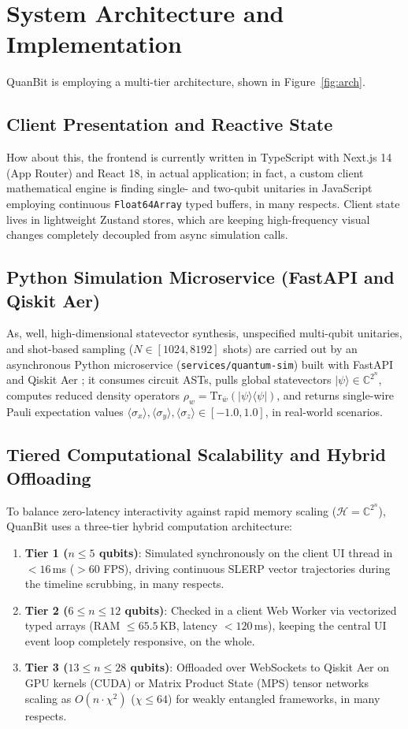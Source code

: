 \documentclass[conference]{IEEEtran}
\begin{document}
\section{System Architecture and Implementation}
\label{sec:arch_impl}

QuanBit is employing a multi-tier architecture, shown in Figure~\ref{fig:arch}.

\subsection{Client Presentation and Reactive State}
How about this, the frontend is currently written in TypeScript with Next.js 14 (App Router) and React 18, in actual application; in fact, a custom client mathematical engine is finding single- and two-qubit unitaries in JavaScript employing continuous \texttt{Float64Array} typed buffers, in many respects. Client state lives in lightweight Zustand stores, which are keeping high-frequency visual changes completely decoupled from async simulation calls.

\subsection{Python Simulation Microservice (FastAPI and Qiskit Aer)}
As, well, high-dimensional statevector synthesis, unspecified multi-qubit unitaries, and shot-based sampling ($N \in [1024, 8192]$ shots) are carried out by an asynchronous Python microservice (\texttt{services/quantum-sim}) built with FastAPI and Qiskit Aer \cite{b18}; it consumes circuit ASTs, pulls global statevectors $|\psi\rangle \in \mathbb{C}^{2^n}$, computes reduced density operators $\rho_w = \text{Tr}_{\bar{w}}(|\psi\rangle\langle\psi|)$, and returns single-wire Pauli expectation values $\langle \sigma_x \rangle, \langle \sigma_y \rangle, \langle \sigma_z \rangle \in [-1.0, 1.0]$, in real-world scenarios.

\subsection{Tiered Computational Scalability and Hybrid Offloading}
To balance zero-latency interactivity against rapid memory scaling ($\mathcal{H} = \mathbb{C}^{2^n}$), QuanBit uses a three-tier hybrid computation architecture:
\begin{enumerate}[leftmargin=*,noitemsep,topsep=1pt]
    \item \textbf{Tier 1 ($n \le 5$ qubits)}: Simulated synchronously on the client UI thread in $<16$\,ms ($>60$ FPS), driving continuous SLERP vector trajectories during the timeline scrubbing, in many respects.
    \item \textbf{Tier 2 ($6 \le n \le 12$ qubits)}: Checked in a client Web Worker via vectorized typed arrays (RAM $\le 65.5$\,KB, latency $<120$\,ms), keeping the central UI event loop completely responsive, on the whole.
    \item \textbf{Tier 3 ($13 \le n \le 28$ qubits)}: Offloaded over WebSockets to Qiskit Aer on GPU kernels (CUDA) or Matrix Product State (MPS) tensor networks scaling as $O(n \cdot \chi^2)$ ($\chi \le 64$) for weakly entangled frameworks, in many respects.
\end{enumerate}
\end{document}
